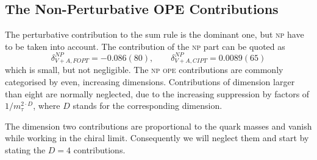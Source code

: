 \documentclass[../../index.tex]{subfiles}
\begin{document}
\subsection{The Non-Perturbative OPE Contributions}
The perturbative contribution to the sum rule is the dominant one, but
\textsc{np} have to be taken into account. The contribution of the \textsc{np}
part can be quoted as \cite{Jamin2013}
\begin{equation}
  \delta_{V+A,FOPT}^{NP} = -0.086(80), \qquad \delta_{V+A,CIPT}^{NP} = 0.0089(65)
\end{equation}
which is small, but not negligible. The \textsc{np} \textsc{ope} contributions
are commonly categorised by even, increasing dimensions. Contributions of
dimension larger than eight are normally neglected, due to the increasing
suppression by factors of \(1/m_\tau^{2\cdot D}\), where \(D\) stands for the
corresponding dimension.

The dimension two contributions are proportional to the quark masses and vanish
while working in the chiral limit. Consequently we will neglect them and start
by stating the \(D=4\) contributions.
\end{document}
